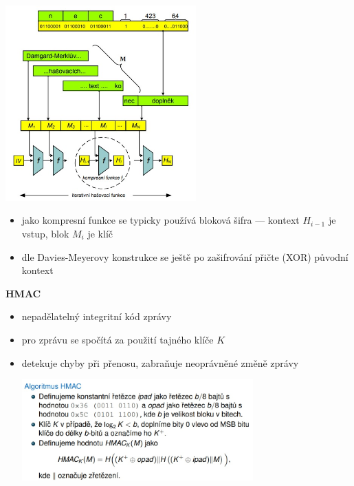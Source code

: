 \includegraphics[width=0.55\textwidth]{img/SP-9_0.jpg}

\begin{itemize}
	\item jako kompresní funkce se typicky používá bloková šifra --- kontext $H_{i-1}$ je vstup, blok $M_i$ je klíč
	\item dle Davies-Meyerovy konstrukce se ještě po zašifrování přičte (XOR) původní kontext
\end{itemize}

\textbf{HMAC}
\begin{itemize}
	\item nepadělatelný integritní kód zprávy
	\item pro zprávu se spočítá za použití tajného klíče $K$
	\item detekuje chyby při přenosu, zabraňuje neoprávněné změně zprávy
	
	\includegraphics[width=0.7\textwidth]{img/SP-9_1.jpg}
\end{itemize}

